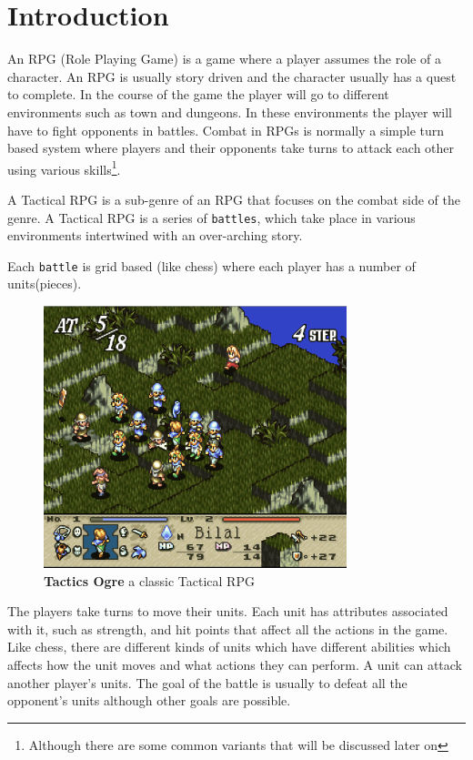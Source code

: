 
\section{Introduction} 
\label{introduction}
       
An RPG (Role Playing Game) is a game where a player assumes the role of a character. An RPG is usually story driven and the character usually has a quest to complete. In the course of the game the player will go to different environments such as town and dungeons. In these environments the player will have to fight opponents in battles. Combat in RPGs is normally a simple turn based system where players and their opponents take turns to attack each other using various skills\footnote{Although there are some common variants that will be discussed later on}. 

A Tactical RPG is a sub-genre of an RPG that focuses on the combat side of the genre. A Tactical RPG is a series of \texttt{battles}, which take place in various environments intertwined with an over-arching story.

Each \texttt{battle} is grid based (like chess) where each player has a number of units(pieces). 
\begin{figure}[htbp] \centering 
	\includegraphics[height=3in]{figures/TRPG.png} 
	\caption{\textbf{Tactics Ogre}\cite{to} a classic Tactical RPG } 
	\label{fig:TRPG} 
\end{figure}
The players take turns to move their units. Each unit has attributes associated with it, such as strength, and hit points that affect all the actions in the game. Like chess, there are different kinds of units which have different abilities which affects how the unit moves and what actions they can perform. A unit can attack another player's units. The goal of the battle is usually to defeat all the opponent's units although other goals are possible.

